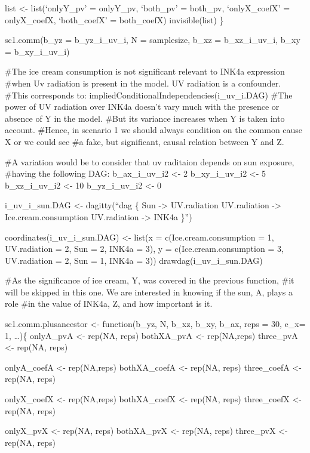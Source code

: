 \documentclass[
]{article}
\begin{document}
list \textless- list(`onlyY\_pv' = onlyY\_pv, `both\_pv' = both\_pv,
`onlyX\_coefX' = onlyX\_coefX, `both\_coefX' = both\_coefX)
invisible(list) \}

sc1.comm(b\_yz = b\_yz\_i\_uv\_i, N = samplesize, b\_xz =
b\_xz\_i\_uv\_i, b\_xy = b\_xy\_i\_uv\_i)

\#The ice cream consumption is not significant relevant to INK4a
expression \#when Uv radiation is present in the model. UV radiation is
a confounder. \#This corresponds to:
impliedConditionalIndependencies(i\_uv\_i.DAG) \#The power of UV
radiation over INK4a doesn't vary much with the presence or absence of Y
in the model. \#But its variance increases when Y is taken into account.
\#Hence, in scenario 1 we should always condition on the common cause X
or we could see \#a fake, but significant, causal relation between Y and
Z.

\#A variation would be to consider that uv raditaion depends on sun
exposure, \#having the following DAG: b\_ax\_i\_uv\_i2 \textless- 2
b\_xy\_i\_uv\_i2 \textless- 5 b\_xz\_i\_uv\_i2 \textless- 10
b\_yz\_i\_uv\_i2 \textless- 0

i\_uv\_i\_sun.DAG \textless- dagitty(``dag \{ Sun -\textgreater{}
UV.radiation UV.radiation -\textgreater{} Ice.cream.consumption
UV.radiation -\textgreater{} INK4a \}'')

coordinates(i\_uv\_i\_sun.DAG) \textless- list(x =
c(Ice.cream.consumption = 1, UV.radiation = 2, Sun = 2, INK4a = 3), y =
c(Ice.cream.consumption = 3, UV.radiation = 2, Sun = 1, INK4a = 3))
drawdag(i\_uv\_i\_sun.DAG)

\#As the significance of ice cream, Y, was covered in the previous
function, \#it will be skipped in this one. We are interested in knowing
if the sun, A, plays a role \#in the value of INK4a, Z, and how
important is it.

sc1.comm.plusancestor \textless- function(b\_yz, N, b\_xz, b\_xy, b\_ax,
reps = 30, e\_x= 1, \ldots)\{ onlyA\_pvA \textless- rep(NA, reps)
bothXA\_pvA \textless- rep(NA,reps) three\_pvA \textless- rep(NA, reps)

onlyA\_coefA \textless- rep(NA,reps) bothXA\_coefA \textless- rep(NA,
reps) three\_coefA \textless- rep(NA, reps)

onlyX\_coefX \textless- rep(NA,reps) bothXA\_coefX \textless- rep(NA,
reps) three\_coefX \textless- rep(NA, reps)

onlyX\_pvX \textless- rep(NA, reps) bothXA\_pvX \textless- rep(NA, reps)
three\_pvX \textless- rep(NA, reps)
\end{document}
